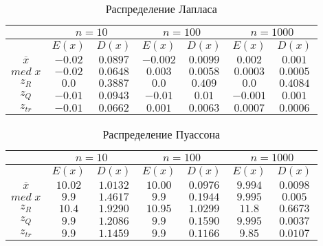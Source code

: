 \documentclass[12pt,a4paper]{article}
\begin{document}
		\begin{table}[H]
			\begin{center}
				\begin{tabular}{|c|c|c|c|c|c|c|}
					\hline
					& \multicolumn{2}{c|}{$n=10$} & \multicolumn{2}{c|}{$n=100$} & \multicolumn{2}{c|}{$n=1000$}\\
					\hline
					& $E(x)$ & $D(x)$ & $E(x)$ & $D(x)$ & $E(x)$ & $D(x)$\\
					\hline
					$\overline{x}$ & $-0.02$ & $0.0897$ & $-0.002$ & $0.0099$ & $0.002$ & $0.001$\\
					\hline
					$med\;x$ & $-0.02$ & $0.0648$ & $0.003$ & $0.0058$ & $0.0003$ & $0.0005$\\
					\hline
					$z_R$ & $0.0$ & $0.3887$ & $0.0$ & $0.409$ & $0.0$ & $0.4084$\\
					\hline
					$z_Q$ & $-0.01$ & $0.0943$ & $-0.01$ & $0.01$ & $-0.001$ & $0.001$\\
					\hline
					$z_{tr}$ & $-0.01$ & $0.0662$ & $0.001$ & $0.0063$ & $0.0007$ & $0.0006$\\
					\hline
				\end{tabular}
			\end{center}
			\caption{Распределение Лапласа}
		\end{table}
		
		\begin{table}[H]
			\begin{center}
				\begin{tabular}{|c|c|c|c|c|c|c|}
					\hline
					& \multicolumn{2}{c|}{$n=10$} & \multicolumn{2}{c|}{$n=100$} & \multicolumn{2}{c|}{$n=1000$}\\
					\hline
					& $E(x)$ & $D(x)$ & $E(x)$ & $D(x)$ & $E(x)$ & $D(x)$\\
					\hline
					$\overline{x}$ & $10.02$ & $1.0132$ & $10.00$ & $0.0976$ & $9.994$ & $0.0098$\\
					\hline
					$med\;x$ & $9.9$ & $1.4617$ & $9.9$ & $0.1944$ & $9.995$ & $0.005$\\
					\hline
					$z_R$ & $10.4$ & $1.9290$ & $10.95$ & $1.0299$ & $11.8$ & $0.6673$\\
					\hline
					$z_Q$ & $9.9$ & $1.2086$ & $9.9$ & $0.1590$ & $9.995$ & $0.0037$\\
					\hline
					$z_{tr}$ & $9.9$ & $1.1459$ & $9.9$ & $0.1166$ & $9.85$ & $0.0107$\\
					\hline
				\end{tabular}
			\end{center}
			\caption{Распределение Пуассона}
		\end{table}
		
\end{document}
